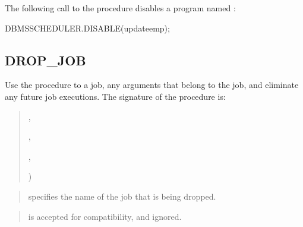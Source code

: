 \documentclass[letterpaper,10pt,english,openany,oneside]{sphinxmanual}
\begin{document}

The following call to the  procedure disables a program named
:

%
\begin{sphinxVerbatim}[commandchars=\\\{\}]
DBMS\PYGZus{}SCHEDULER.DISABLE(\PYGZsq{}update\PYGZus{}emp\PYGZsq{});
\end{sphinxVerbatim}

\newpage


\subsection{DROP\_JOB}
\label{\detokenize{drop_job::doc}}\label{\detokenize{drop_job:drop-job}}
Use the  procedure to  a job,  any arguments that
belong to the job, and eliminate any future job executions. The
signature of the procedure is:
\begin{quote}

\begin{DUlineblock}{0em}
\item[] 
\item[] ,
\item[] ,
\item[] ,
\item[] )
\end{DUlineblock}
\end{quote}


\begin{quote}

 specifies the name of the job that is being dropped.
\end{quote}

\begin{quote}

 is accepted for compatibility, and ignored.
\end{quote}
\end{document}
